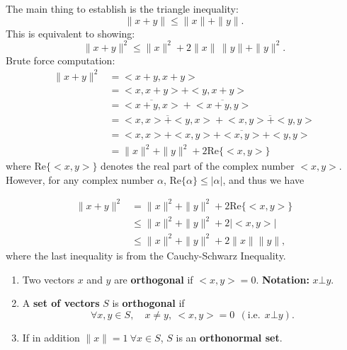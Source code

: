 \documentclass[11pt,twoside]{nsf_jwg}
\newenvironment{definition}{\vspace*{.3in}\noindent{\bf Definition: }}{ }
\newenvironment{prooff}{\vspace*{.1in}\noindent{\bf Proof: }}{ }
\begin{document}
\begin{prooff} The main thing to establish is the triangle inequality:
\[
	\| x + y \| \leqslant \| x \| + \| y \|.
\]
This is equivalent to showing:
\[
	\| x + y \|^2 \leqslant \| x \|^2 + 2 \| x \| \, \| y \| + \| y \|^2.
\]
Brute force computation:
\begin{align*}
	\| x + y \|^2 &= <x+y,x+y> \\
	&= <x,x+y> + <y,x+y>\\
&= \overline{<x+y,x>} + \overline{<x+y,y>}\\
&= \overline{<x,x> + <y,x>} + \overline{<x,y> + <y,y>}\\
	&= <x,x> +  <x,y> +   \overline{<x,y>}+ <y,y> \\
	&= \| x \|^2 + \| y \|^2 + 2 \mathrm{Re}\{ <x,y>\}
\end{align*}
where $\mathrm{Re}\{ <x,y>\}$ denotes the real part of the complex number $<x,y>$. However, for any complex number $\alpha$, $\mathrm{Re}\{\alpha \} \le | \alpha|$, and thus we have

\begin{align*}
\| x + y \|^2 &= \| x \|^2 + \| y \|^2 + 2 \mathrm{Re}\{ <x,y>\} \\
	&\leqslant \| x \|^2 + \| y \|^2 +
		 2 |<x,y>| \\
	&\leqslant \| x \|^2 + \| y \|^2
		+ 2 \|x \| \|y\|,
\end{align*}
where the last inequality is from the Cauchy-Schwarz Inequality.
\end{prooff}

\newpage

\begin{definition} \mbox{}
\begin{enumerate}
\setlength\itemindent{25pt}
\item Two vectors $x$ and $y$ are \textbf{orthogonal} if $<x,y>=0$.
      \textbf{Notation:} $x \bot y$.
\item A \textbf {set of vectors} $S$ is \textbf{orthogonal} if
      \[
	\forall x,y \in S,\quad x \not= y, \ <x,y> = 0~~(\text{i.e.}~~x \bot y).
      \]
\item If in addition $\| x \| = 1 \ \forall x \in S$, $S$ is an
      \textbf{orthonormal set}.
\end{enumerate}
\end{definition}
\vspace{0.5in}
\end{document}

